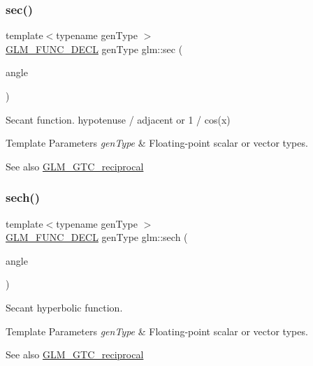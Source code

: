 \subsubsection{\texorpdfstring{sec()}{sec()}}
{\footnotesize\ttfamily template$<$typename gen\+Type $>$ \\
\hyperlink{setup_8hpp_ab2d052de21a70539923e9bcbf6e83a51}{G\+L\+M\+\_\+\+F\+U\+N\+C\+\_\+\+D\+E\+CL} gen\+Type glm\+::sec (\begin{DoxyParamCaption}\item[{gen\+Type}]{angle }\end{DoxyParamCaption})}

Secant function. hypotenuse / adjacent or 1 / cos(x)


\begin{DoxyTemplParams}{Template Parameters}
{\em gen\+Type} & Floating-\/point scalar or vector types.\\
\hline
\end{DoxyTemplParams}
\begin{DoxySeeAlso}{See also}
\hyperlink{group__gtc__reciprocal}{G\+L\+M\+\_\+\+G\+T\+C\+\_\+reciprocal} 
\end{DoxySeeAlso}
\mbox{\label{group__gtc__reciprocal_ga9a5cfd1e7170104a7b33863b1b75e5ae}} 
\subsubsection{\texorpdfstring{sech()}{sech()}}
{\footnotesize\ttfamily template$<$typename gen\+Type $>$ \\
\hyperlink{setup_8hpp_ab2d052de21a70539923e9bcbf6e83a51}{G\+L\+M\+\_\+\+F\+U\+N\+C\+\_\+\+D\+E\+CL} gen\+Type glm\+::sech (\begin{DoxyParamCaption}\item[{gen\+Type}]{angle }\end{DoxyParamCaption})}

Secant hyperbolic function.


\begin{DoxyTemplParams}{Template Parameters}
{\em gen\+Type} & Floating-\/point scalar or vector types.\\
\hline
\end{DoxyTemplParams}
\begin{DoxySeeAlso}{See also}
\hyperlink{group__gtc__reciprocal}{G\+L\+M\+\_\+\+G\+T\+C\+\_\+reciprocal} 
\end{DoxySeeAlso}
